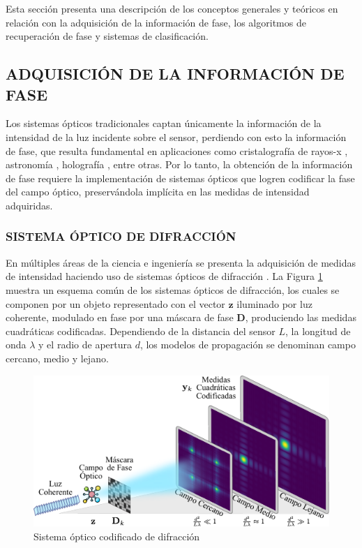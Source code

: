 Esta sección presenta una descripción de los conceptos generales y teóricos en relación con la adquisición de la información de fase, los algoritmos de recuperación de fase y sistemas de clasificación.

\subsection{ADQUISICIÓN DE LA INFORMACIÓN DE FASE}

Los sistemas ópticos tradicionales captan únicamente la información de la intensidad de la luz incidente sobre el sensor, perdiendo con esto la información de fase, que resulta fundamental en aplicaciones como cristalografía de rayos-x \cite{pinilla2018coded}, astronomía \cite{fienup1987phase}, holografía \cite{rivenson2018phase}, entre otras. Por lo tanto, la obtención de la información de  fase  requiere la implementación  de sistemas ópticos que logren codificar la fase del campo óptico, preservándola implícita en las medidas de intensidad adquiridas. 
    
\subsubsection{SISTEMA ÓPTICO DE DIFRACCIÓN}
En múltiples áreas de la ciencia e ingeniería se presenta la adquisición de medidas de intensidad haciendo uso de sistemas ópticos de difracción \cite{fienup1987phase,pinilla2018coded,rivenson2018phase}. La Figura \ref{fig:difraction_systems} muestra un esquema común de los sistemas ópticos de difracción, los cuales se componen por un objeto representado con el vector $\mathbf{z}$ iluminado por luz coherente, modulado en fase por una máscara de fase $\mathbf{D}$, produciendo las medidas cuadráticas codificadas. Dependiendo de la distancia del sensor $L$, la longitud de onda $\lambda$ y el radio de apertura $d$, los modelos de propagación se denominan campo cercano, medio y lejano.

\begin{figure}[H]
    \centering
    \includegraphics[width=\linewidth]{images/DiffractionSystem.pdf}
    \caption{\hspace{2mm}Sistema óptico codificado de difracción}
    \label{fig:difraction_systems}
\end{figure}

